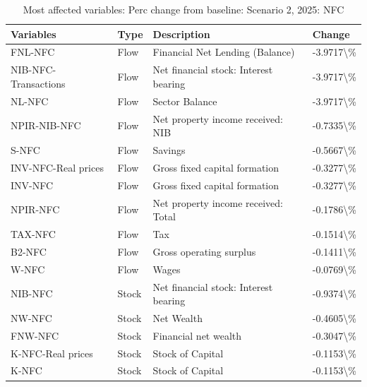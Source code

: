 \documentclass[
]{book}
\begin{document}
\begin{table}

\caption{\label{tab:most-affected-scenario-2-perc-2025-NFC}Most affected variables: Perc change from baseline: Scenario 2, 2025: NFC}
\centering
\fontsize{10}{12}\selectfont
\begin{tabular}[t]{l|l|l|l}
\hline
Variables & Type & Description & Change\\
\hline
FNL-NFC & Flow & Financial Net Lending (Balance) & -3.9717\textbackslash{}\%\\
\hline
NIB-NFC-Transactions & Flow & Net financial stock: Interest bearing & -3.9717\textbackslash{}\%\\
\hline
NL-NFC & Flow & Sector Balance & -3.9717\textbackslash{}\%\\
\hline
NPIR-NIB-NFC & Flow & Net property income received: NIB & -0.7335\textbackslash{}\%\\
\hline
S-NFC & Flow & Savings & -0.5667\textbackslash{}\%\\
\hline
INV-NFC-Real prices & Flow & Gross fixed capital formation & -0.3277\textbackslash{}\%\\
\hline
INV-NFC & Flow & Gross fixed capital formation & -0.3277\textbackslash{}\%\\
\hline
NPIR-NFC & Flow & Net property income received: Total & -0.1786\textbackslash{}\%\\
\hline
TAX-NFC & Flow & Tax & -0.1514\textbackslash{}\%\\
\hline
B2-NFC & Flow & Gross operating surplus & -0.1411\textbackslash{}\%\\
\hline
W-NFC & Flow & Wages & -0.0769\textbackslash{}\%\\
\hline
NIB-NFC & Stock & Net financial stock: Interest bearing & -0.9374\textbackslash{}\%\\
\hline
NW-NFC & Stock & Net Wealth & -0.4605\textbackslash{}\%\\
\hline
FNW-NFC & Stock & Financial net wealth & -0.3047\textbackslash{}\%\\
\hline
K-NFC-Real prices & Stock & Stock of Capital & -0.1153\textbackslash{}\%\\
\hline
K-NFC & Stock & Stock of Capital & -0.1153\textbackslash{}\%\\
\hline
\end{tabular}
\end{table}
\end{document}
